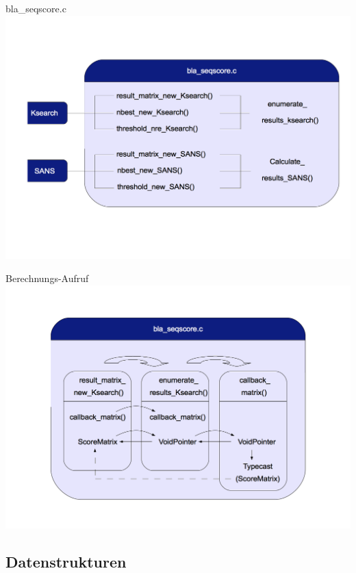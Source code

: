 \documentclass[xcolor=dvipsnames, aspectratio=1610]{beamer}
\begin{document}
\begin{frame}{bla\_seqscore.c}
  \includegraphics[width=\linewidth, t]{img/dia2.png}
\end{frame}

\begin{frame}{Berechnungs-Aufruf}
  \includegraphics[width=\linewidth, t]{img/dia3.png}
\end{frame}

\subsection{Datenstrukturen}
\end{document}
